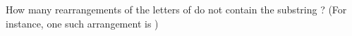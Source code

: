 How many rearrangements of the letters of  do not contain the substring ? (For instance, one such arrangement is )